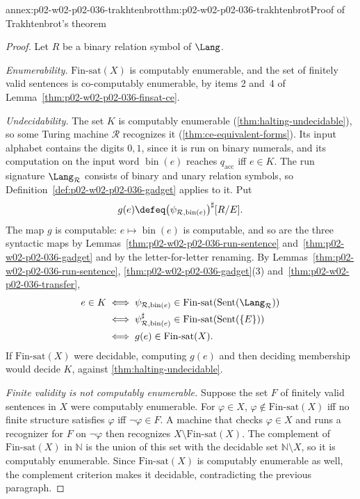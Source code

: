 \begin{annexitem}{annex:p02-w02-p02-036-trakhtenbrot}{thm:p02-w02-p02-036-trakhtenbrot}{Proof of Trakhtenbrot's theorem}
\begin{proof}
Let \(R\) be a binary relation symbol of \(\Lang\).

\emph{Enumerability.}  \(\mathrm{Fin\text{-}sat}(X)\) is computably enumerable,
and the set of finitely valid sentences is co-computably enumerable, by items
2 and~4 of Lemma~\ref{thm:p02-w02-p02-036-finsat-ce}.

\emph{Undecidability.}  The set \(K\) is computably enumerable
(\cref{thm:halting-undecidable}), so some Turing machine \(\mathcal R\)
recognizes it (\cref{thm:ce-equivalent-forms}).  Its input alphabet contains
the digits \(0,1\), since it is run on binary numerals, and its computation on
the input word \(\operatorname{bin}(e)\) reaches \(q_{\mathrm{acc}}\) iff
\(e\in K\).  The
run signature \(\Lang_{\mathcal R}\) consists of binary and unary relation
symbols, so Definition~\ref{def:p02-w02-p02-036-gadget} applies to it.  Put
\[
 g(e)\defeq\bigl(\psi_{\mathcal R,\operatorname{bin}(e)}\bigr)^{\sharp}[R/E].
\]
The map \(g\) is computable: \(e\mapsto\operatorname{bin}(e)\) is computable,
and so are the three syntactic maps by
Lemmas~\ref{thm:p02-w02-p02-036-run-sentence}
and~\ref{thm:p02-w02-p02-036-gadget} and by the letter-for-letter renaming.
By Lemmas~\ref{thm:p02-w02-p02-036-run-sentence},
\ref{thm:p02-w02-p02-036-gadget}(3) and~\ref{thm:p02-w02-p02-036-transfer},
\[
\begin{aligned}
 e\in K
 &\iff \psi_{\mathcal R,\operatorname{bin}(e)}\in
      \mathrm{Fin\text{-}sat}(\operatorname{Sent}(\Lang_{\mathcal R}))\\
 &\iff \psi_{\mathcal R,\operatorname{bin}(e)}^{\sharp}\in
      \mathrm{Fin\text{-}sat}(\operatorname{Sent}(\{E\}))\\
 &\iff g(e)\in\mathrm{Fin\text{-}sat}(X).
\end{aligned}
\]
If \(\mathrm{Fin\text{-}sat}(X)\) were decidable, computing \(g(e)\) and then
deciding membership would decide \(K\), against
\cref{thm:halting-undecidable}.

\emph{Finite validity is not computably enumerable.}  Suppose the set \(F\) of
finitely valid sentences in \(X\) were computably enumerable.  For
\(\varphi\in X\), \(\varphi\notin\mathrm{Fin\text{-}sat}(X)\) iff no finite
structure satisfies \(\varphi\) iff \(\neg\varphi\in F\).  A machine that
checks \(\varphi\in X\) and runs a recognizer for \(F\) on \(\neg\varphi\)
then recognizes \(X\setminus\mathrm{Fin\text{-}sat}(X)\).  The complement of
\(\mathrm{Fin\text{-}sat}(X)\) in \(\mathbb N\) is the union of this set with
the decidable set \(\mathbb N\setminus X\), so it is computably enumerable.
Since \(\mathrm{Fin\text{-}sat}(X)\) is computably enumerable as well, the
complement criterion makes it decidable, contradicting the previous
paragraph.
\end{proof}
\end{annexitem}

